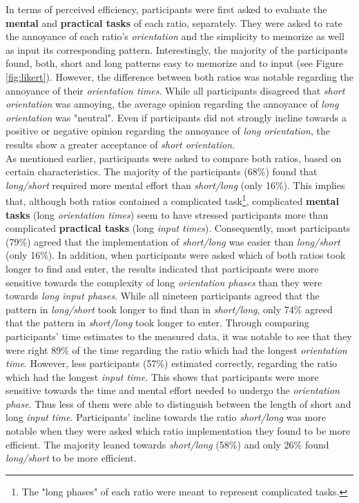 In terms of perceived efficiency, participants were first asked to evaluate the \textbf{mental} and \textbf{practical tasks} of each ratio, separately. They were asked to rate the annoyance of each ratio's \textit{orientation} and the simplicity to memorize as well as input its corresponding pattern. Interestingly, the majority of the participants found, both, short and long patterns easy to memorize and to input (see Figure \ref{fig:likert}). However, the difference between both ratios was notable regarding the annoyance of their \textit{orientation times}. While all participants disagreed that \textit{short orientation} was annoying, the average opinion regarding the annoyance of \textit{long orientation} was "neutral". Even if participants did not strongly incline towards a positive or negative opinion regarding the annoyance of \textit{long orientation}, the results show a greater acceptance of \textit{short orientation}. \\

As mentioned earlier, participants were asked to compare both ratios, based on certain characteristics. The majority of the participants (68\%) found that \textit{long/short} required more mental effort than \textit{short/long} (only 16\%). This implies that, although both ratios contained a complicated task\footnote{The "long phases" of each ratio were meant to represent complicated tasks.}, complicated \textbf{mental tasks} (long \textit{orientation times}) seem to have stressed participants more than complicated \textbf{practical tasks} (long \textit{input times}). Consequently, most participants (79\%) agreed that the implementation of \textit{short/long} was easier than \textit{long/short} (only 16\%). In addition, when participants were asked which of both ratios took longer to find and enter, the results indicated that participants were more sensitive towards the complexity of long \textit{orientation phases} than they were towards \textit{long input phases}. While all nineteen participants agreed that the pattern in \textit{long/short} took longer to find than in \textit{short/long}, only 74\% agreed that the pattern in \textit{short/long} took longer to enter. Through comparing participants' time estimates to the measured data, it was notable to see that they were right 89\% of the time regarding the ratio which had the longest \textit{orientation time}. However, less participants (57\%) estimated correctly, regarding the ratio which had the longest \textit{input time}. This shows that participants were more sensitive towards the time and mental effort needed to undergo the \textit{orientation phase}. Thus less of them were able to distinguish between the length of short and long \textit{input time}. Participants' incline towards the ratio \textit{short/long} was more notable when they were asked which ratio implementation they found to be more efficient. The majority leaned towards \textit{short/long} (58\%) and only 26\% found \textit{long/short} to be more efficient.\\

